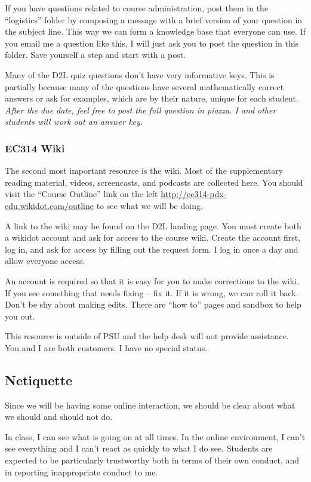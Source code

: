 \documentclass[letterpaper,10pt]{article}
\begin{document}
If you have questions related to course administration, post them in
the ``logistics'' folder by composing a message with a brief version of your question in the subject line. This way we can form a knowledge base that everyone can use.  If you email me a question like this, I will just ask you to post the question in this folder.  Save yourself a step and start with a post.

Many of the D2L quiz questions don't have very informative keys. This is partially because many of the questions have several mathematically correct answers or ask for examples, which are by their nature, unique for each student. \emph{After the due date, feel free to post the full question in piazza.  I and other students will work out an answer key.}


\subsubsection{EC314 Wiki}
The second most important resource is the wiki.  Most of the
supplementary reading material, videos, screencasts, and podcasts are
collected here. You should visit the ``Course Outline'' link on the
left \url{http://ec314-pdx-edu.wikidot.com/outline} to see what we will be
doing.

A link to the wiki may be found on the D2L landing page.  You must create both a wikidot account and ask for access to the course wiki.  Create the account first, log in, and ask for access by filling out the request form.  I log in once a day and allow everyone access.  

An account is required so that it is easy for you to make corrections to the wiki.  If you see something that needs fixing -- fix it.  If it is wrong, we can roll it back.  Don't be shy about making edits.  There are ``how to'' pages and sandbox to help you out.

This resource is outside of PSU and the help desk will not provide
assistance.  You and I are both customers. I have no special status.

\subsection{Netiquette}
Since we will be having some online interaction, we should be clear
about what we should and should not do.

In class, I can see what is going on at all times.  In the online
environment, I can't see everything and I can't react as quickly to
what I do see.  Students are expected to be particularly trustworthy
both in terms of their own conduct, and in reporting inappropriate
conduct to me.
\end{document}
